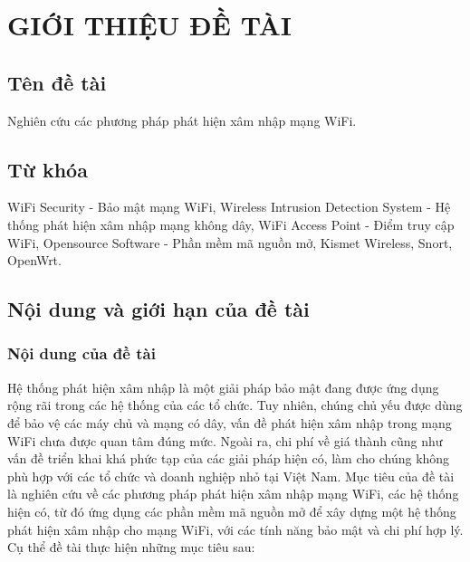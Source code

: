 
\chapter{GIỚI THIỆU ĐỀ TÀI}

\ifpdf
    \graphicspath{{Chapter1/Chapter1Figs/PNG/}{Chapter1/Chapter1Figs/PDF/}{Chapter1/Chapter1Figs/}}
\else
    \graphicspath{{Chapter1/Chapter1Figs/EPS/}{Chapter1/Chapter1Figs/}}
\fi

\section{Tên đề tài}
Nghiên cứu các phương pháp phát hiện xâm nhập mạng WiFi.

\section{Từ khóa}
WiFi Security - Bảo mật mạng WiFi, Wireless Intrusion Detection System - Hệ thống phát hiện xâm nhập mạng không dây, WiFi Access Point - Điểm truy cập WiFi, Opensource Software - Phần mềm mã nguồn mở, Kismet Wireless, Snort, OpenWrt.

\section{Nội dung và giới hạn của đề tài}

\subsection{Nội dung của đề tài}
Hệ thống phát hiện xâm nhập là một giải pháp bảo mật đang được ứng dụng rộng rãi trong các hệ thống của các tổ chức. Tuy nhiên, chúng chủ yếu được dùng để bảo vệ các máy chủ và mạng có dây, vấn đề phát hiện xâm nhập trong mạng WiFi chưa được quan tâm đúng mức. Ngoài ra, chi phí về giá thành cũng như vấn đề triển khai khá phức tạp của các giải pháp hiện có, làm cho chúng không phù hợp với các tổ chức và doanh nghiệp nhỏ tại Việt Nam. Mục tiêu của đề tài là nghiên cứu về các phương pháp phát hiện xâm nhập mạng WiFi, các hệ thống hiện có, từ đó ứng dụng các phần mềm mã nguồn mở để xây dựng một hệ thống phát hiện xâm nhập cho mạng WiFi, với các tính năng bảo mật và chi phí hợp lý. Cụ thể đề tài thực hiện những mục tiêu sau:


